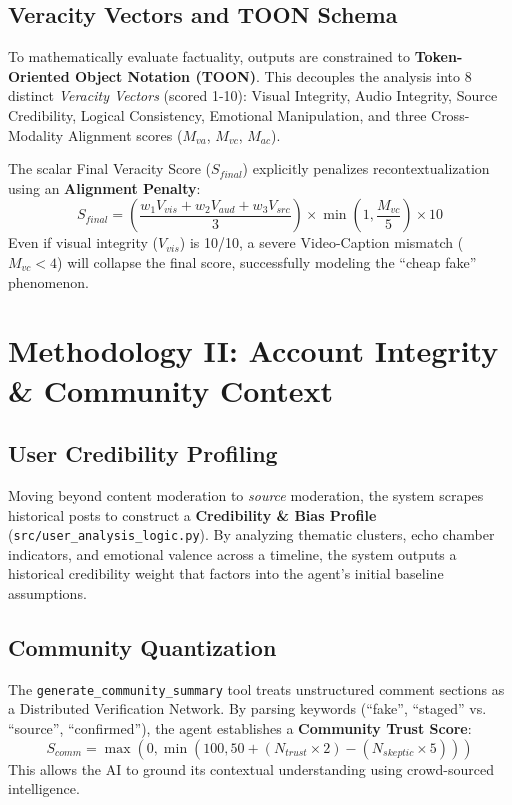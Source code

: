 \documentclass[12pt,letterpaper]{article}
\begin{document}
\subsection{Veracity Vectors and TOON Schema}
To mathematically evaluate factuality, outputs are constrained to \textbf{Token-Oriented Object Notation (TOON)}. This decouples the analysis into 8 distinct \textit{Veracity Vectors} (scored 1-10): Visual Integrity, Audio Integrity, Source Credibility, Logical Consistency, Emotional Manipulation, and three Cross-Modality Alignment scores ($M_{va}$, $M_{vc}$, $M_{ac}$).

The scalar Final Veracity Score ($S_{final}$) explicitly penalizes recontextualization using an \textbf{Alignment Penalty}:
\begin{equation}
    S_{final} = \left( \frac{w_1 V_{vis} + w_2 V_{aud} + w_3 V_{src}}{3} \right) \times \min\left(1, \frac{M_{vc}}{5}\right) \times 10
\end{equation}
Even if visual integrity ($V_{vis}$) is 10/10, a severe Video-Caption mismatch ($M_{vc} < 4$) will collapse the final score, successfully modeling the ``cheap fake'' phenomenon.

\section{Methodology II: Account Integrity \& Community Context}

\subsection{User Credibility Profiling}
Moving beyond content moderation to \textit{source} moderation, the system scrapes historical posts to construct a \textbf{Credibility \& Bias Profile} (\texttt{src/user\_analysis\_logic.py}). By analyzing thematic clusters, echo chamber indicators, and emotional valence across a timeline, the system outputs a historical credibility weight that factors into the agent's initial baseline assumptions.

\subsection{Community Quantization}
The \texttt{generate\_community\_summary} tool treats unstructured comment sections as a Distributed Verification Network. By parsing keywords (``fake'', ``staged'' vs. ``source'', ``confirmed''), the agent establishes a \textbf{Community Trust Score}:
\begin{equation}
    S_{comm} = \max\left(0, \min\left(100, 50 + (N_{trust} \times 2) - (N_{skeptic} \times 5)\right)\right)
\end{equation}
This allows the AI to ground its contextual understanding using crowd-sourced intelligence.
\end{document}
